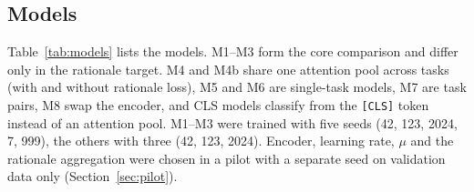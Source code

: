 \documentclass[preprint,12pt,authoryear]{elsarticle}
\begin{document}
\begin{table}[t]
\centering
\caption{Datasets after preparation. Positive rate: share of posts with at least one toxicity label (Jigsaw), labelled implicit hate (IHC), or labelled hate or offensive (HateXplain).}
\label{tab:data}
\small
{}
\end{table}

\subsection{Models}
Table~\ref{tab:models} lists the models. M1--M3 form the core comparison and differ only in the rationale target. M4 and M4b share one attention pool across tasks (with and without rationale loss), M5 and M6 are single-task models, M7 are task pairs, M8 swap the encoder, and CLS models classify from the \texttt{[CLS]} token instead of an attention pool. M1--M3 were trained with five seeds (42, 123, 2024, 7, 999), the others with three (42, 123, 2024). Encoder, learning rate, $\mu$ and the rationale aggregation were chosen in a pilot with a separate seed on validation data only (Section~\ref{sec:pilot}).
\end{document}
